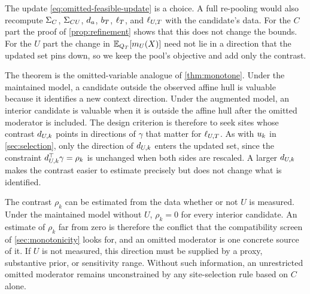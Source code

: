 The update \eqref{eq:omitted-feasible-update} is a choice. A full re-pooling
would also recompute $\Sigma_C$, $\Sigma_{CU}$, $d_{a}$, $b_T$, $\ell_T$, and
$\ell_{U,T}$ with the candidate's data. For the $C$ part the proof of
\cref{prop:refinement} shows that this does not change the bounds. For
the $U$ part the change in $\mathbb{E}_{Q_T}[m_U(X)]$ need not lie in a direction
that the updated set pins down, so we keep the pool's objective and add
only the contrast.

The theorem is the omitted-variable analogue of \cref{thm:monotone}. Under the
maintained model, a candidate outside the observed affine hull is valuable
because it identifies a new context direction. Under the augmented model, an
interior candidate is valuable when it is outside the affine hull after the
omitted moderator is included. The design criterion is therefore to seek
sites whose contrast $d_{U,k}$ points in directions of $\gamma$ that matter
for $\ell_{U,T}$. As with $u_{k}$ in \cref{sec:selection}, only the
direction of $d_{U,k}$ enters the updated set, since the constraint
$d_{U,k}^\top\gamma=\rho_k$ is unchanged when both sides are rescaled. A
larger $d_{U,k}$ makes the contrast easier to estimate precisely but
does not change what is identified.

The contrast $\rho_k$ can be estimated from the data whether or not $U$ is
measured. Under the maintained model without $U$, $\rho_k=0$ for every
interior candidate. An estimate of $\rho_k$ far from zero is therefore
the conflict that the compatibility screen of \cref{sec:monotonicity}
looks for, and an omitted moderator is one concrete source of it. If $U$ is not measured, this direction must be supplied by a proxy,
substantive prior, or sensitivity range. Without such information, an
unrestricted omitted moderator remains unconstrained by any site-selection
rule based on $C$ alone.
